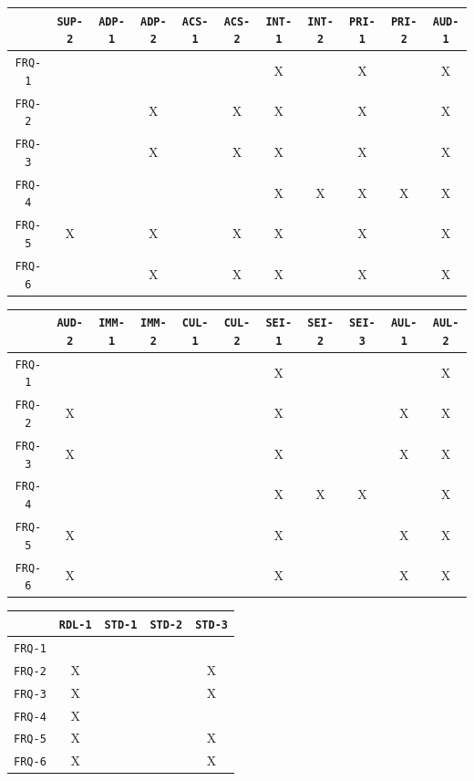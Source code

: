 \documentclass[12pt]{article}
\begin{document}
\begin{tabular}{|c|c|c|c|c|c|c|c|c|c|c|}
\hline
	& \texttt{SUP-2} & \texttt{ADP-1} & \texttt{ADP-2} & \texttt{ACS-1} & \texttt{ACS-2} & \texttt{INT-1} & \texttt{INT-2} & \texttt{PRI-1} & \texttt{PRI-2} & \texttt{AUD-1} \\
\hline
\texttt{FRQ-1} &  &  &  &  &  & X &  & X &  & X \\ \hline
\texttt{FRQ-2} &  &  & X &  & X & X &  & X &  & X \\ \hline
\texttt{FRQ-3} &  &  & X &  & X & X &  & X &  & X \\ \hline
\texttt{FRQ-4} &  &  &  &  &  & X & X & X & X & X \\ \hline
\texttt{FRQ-5} & X &  & X &  & X & X &  & X &  & X \\ \hline
\texttt{FRQ-6} &  &  & X &  & X & X &  & X &  & X \\ \hline
\end{tabular}

\begin{tabular}{|c|c|c|c|c|c|c|c|c|c|c|}
\hline
	& \texttt{AUD-2} & \texttt{IMM-1} & \texttt{IMM-2} & \texttt{CUL-1} & \texttt{CUL-2} & \texttt{SEI-1} & \texttt{SEI-2} & \texttt{SEI-3} & \texttt{AUL-1} & \texttt{AUL-2} \\
\hline
\texttt{FRQ-1} &  &  &  &  &  & X &  &  &  & X \\ \hline
\texttt{FRQ-2} & X &  &  &  &  & X &  &  & X & X \\ \hline
\texttt{FRQ-3} & X &  &  &  &  & X &  &  & X & X \\ \hline
\texttt{FRQ-4} &  &  &  &  &  & X & X & X &  & X \\ \hline
\texttt{FRQ-5} & X &  &  &  &  & X &  &  & X & X \\ \hline
\texttt{FRQ-6} & X &  &  &  &  & X &  &  & X & X \\ \hline
\end{tabular}

\begin{tabular}{|c|c|c|c|c|}
\hline
	& \texttt{RDL-1} & \texttt{STD-1} & \texttt{STD-2} & \texttt{STD-3} \\
\hline
\texttt{FRQ-1} &  &  &  &  \\ \hline
\texttt{FRQ-2} & X &  &  & X \\ \hline
\texttt{FRQ-3} & X &  &  & X \\ \hline
\texttt{FRQ-4} & X &  &  &  \\ \hline
\texttt{FRQ-5} & X &  &  & X \\ \hline
\texttt{FRQ-6} & X &  &  & X \\ \hline
\end{tabular}
\end{document}
